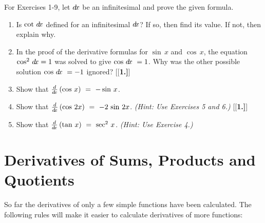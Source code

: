 \divider
\vspace{3mm}
\startexercises\label{sec1dot3}
{\small
{}
\par\noindent For Exercises 1-9, let $d\!x$ be an infinitesimal and prove the given formula.
\begin{enumerate}[\bfseries 1.]
 \item Is $\cot\,d\!x$ defined for an infinitesimal $d\!x$? If so, then find its value.
  If not, then explain why.
 \item In the proof of the derivative formulas for $\sin\, x$ and $\cos\, x$,
 the equation $\cos^2\,d\!x = 1$ was solved to give $\cos\,d\!x\ = 1$.
 Why was the other possible solution $\cos\,d\!x\ = -1$ ignored?
[{[\bfseries 1.]}]
 \item Show that $\frac{d}{d\!x} \,(\cos\,x) ~=~ -\sin\,x$.
 \item Show that $\frac{d}{d\!x} \,(\cos\,2x) ~=~ -2\,\sin\,2x$. \emph{(Hint: Use Exercises
 5 and 6.)}
[{[\bfseries 1.]}]
 \item Show that $\frac{d}{d\!x} \,(\tan\,x) ~=~ \sec^2 \,x$. \emph{(Hint: Use Exercise 4.)}
\end{enumerate}}
\newpage
\section{Derivatives of Sums, Products and Quotients}
So far the derivatives of only a few simple functions have been calculated. The
following rules will make it easier to calculate derivatives of more functions:

